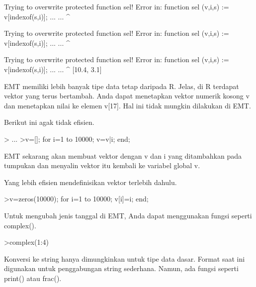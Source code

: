 \documentclass[a4paper,10pt]{article}
\begin{document}
\begin{eulernotebook}
\begin{euleroutput}
  Trying to overwrite protected function sel!
  Error in:
  function sel (v,i,s) := v[indexof(s,i)]; ... ...
               ^
  
  Trying to overwrite protected function sel!
  Error in:
  function sel (v,i,s) := v[indexof(s,i)]; ... ...
               ^
  
  Trying to overwrite protected function sel!
  Error in:
  function sel (v,i,s) := v[indexof(s,i)]; ... ...
               ^
  [10.4,  3.1]
\end{euleroutput}
\begin{eulercomment}
EMT memiliki lebih banyak tipe data tetap daripada R. Jelas, di R
terdapat vektor yang terus bertambah. Anda dapat menetapkan vektor
numerik kosong v dan menetapkan nilai ke elemen v[17]. Hal ini tidak
mungkin dilakukan di EMT.

Berikut ini agak tidak efisien.
\end{eulercomment}
\begin{eulerprompt}
> ...
>v=[]; for i=1 to 10000; v=v|i; end;
\end{eulerprompt}
\begin{eulercomment}
EMT sekarang akan membuat vektor dengan v dan i yang ditambahkan pada
tumpukan dan menyalin vektor itu kembali ke variabel global v.

Yang lebih efisien mendefinisikan vektor terlebih dahulu.
\end{eulercomment}
\begin{eulerprompt}
>v=zeros(10000); for i=1 to 10000; v[i]=i; end;
\end{eulerprompt}
\begin{eulercomment}
Untuk mengubah jenis tanggal di EMT, Anda dapat menggunakan fungsi
seperti complex().
\end{eulercomment}
\begin{eulerprompt}
>complex(1:4)
\end{eulerprompt}
\begin{euleroutput}
  [ 1+0i ,  2+0i ,  3+0i ,  4+0i  ]
\end{euleroutput}
\begin{eulercomment}
Konversi ke string hanya dimungkinkan untuk tipe data dasar. Format
saat ini digunakan untuk penggabungan string sederhana. Namun, ada
fungsi seperti print() atau frac().


\end{eulercomment}
\end{eulernotebook}
\end{document}
